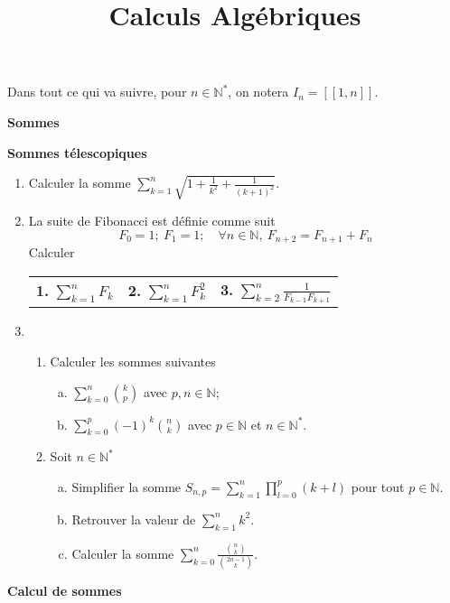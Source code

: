 \documentclass[7pt, twocolumn]{extarticle}
\title{\textbf{Calculs Algébriques}}
\date{}
\newcommand{\sct}[1]{
	\begin{center}
		\Large\textbf{#1}
	\end{center}
}
\newcommand{\subsct}[1]{
	\begin{center}
		\large\textbf{#1}
	\end{center}
}
\newcommand{\q}[1]{\textbf{#1.}\quad}
\def\N{\mathbb N}
\begin{document}
	\maketitle
	Dans tout ce qui va suivre, pour $n\in\N^*$, on notera $I_n=[\![1,n]\!]$.
	\sct{Sommes}
	\subsct{Sommes télescopiques}

	\vspace{2mm}

	\begin{enumerate}[start=1,label={\bfseries \arabic*}]
		\item Calculer la somme \(\sum_{k=1}^n\sqrt{1+\frac1{k^2}+\frac1{(k+1)^2}}\).
		\item La suite de Fibonacci est définie comme suit \[F_0=1;\ F_1=1;\quad \forall n\in\N,\ F_{n+2}=F_{n+1}+F_n\]
		Calculer 
		\begin{tabular}{c c c}
			\q1 \(\sum_{k=1}^nF_k\) & \q2 \(\sum_{k=1}^nF_k^2\) & \q3 \(\sum_{k=2}^n\frac1{F_{k-1}F_{k+1}}\)
		\end{tabular}
		\item 
		\begin{enumerate}[start=1, label={\bfseries \arabic*.}]
			\item Calculer les sommes suivantes
				\begin{enumerate}[(a)]
					\item \(\sum_{k=0}^n{\binom{k}{p}}\) avec $p,n\in\N$;
					\item \(\sum_{k=0}^p(-1)^k{\binom{n}{k}}\) avec $p\in\N$ et $n\in\N^*$.
				\end{enumerate}
			\item Soit $n\in\N^*$
				\begin{enumerate}[(a)]
					\item Simplifier la somme $S_{n,p}=\sum_{k=1}^n\prod_{l=0}^p(k+l)$ pour tout $p\in\N$.
					\item Retrouver la valeur de $\sum_{k=1}^nk^2$.
					\item Calculer la somme $\sum_{k=0}^n\frac{\binom{n}{k}}{\binom{2n-1}{k}}$.
				\end{enumerate}
		\end{enumerate}
	\end{enumerate}

	\subsct{Calcul de sommes}
\end{document}
